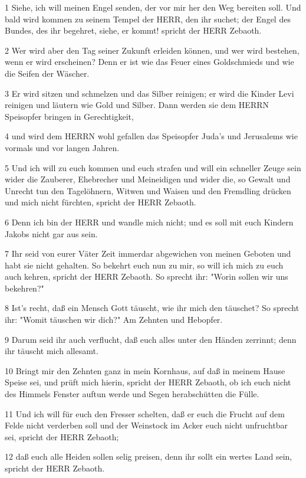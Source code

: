 \par 1 Siehe, ich will meinen Engel senden, der vor mir her den Weg bereiten soll. Und bald wird kommen zu seinem Tempel der HERR, den ihr suchet; der Engel des Bundes, des ihr begehret, siehe, er kommt! spricht der HERR Zebaoth.
\par 2 Wer wird aber den Tag seiner Zukunft erleiden können, und wer wird bestehen, wenn er wird erscheinen? Denn er ist wie das Feuer eines Goldschmieds und wie die Seifen der Wäscher.
\par 3 Er wird sitzen und schmelzen und das Silber reinigen; er wird die Kinder Levi reinigen und läutern wie Gold und Silber. Dann werden sie dem HERRN Speisopfer bringen in Gerechtigkeit,
\par 4 und wird dem HERRN wohl gefallen das Speisopfer Juda's und Jerusalems wie vormals und vor langen Jahren.
\par 5 Und ich will zu euch kommen und euch strafen und will ein schneller Zeuge sein wider die Zauberer, Ehebrecher und Meineidigen und wider die, so Gewalt und Unrecht tun den Tagelöhnern, Witwen und Waisen und den Fremdling drücken und mich nicht fürchten, spricht der HERR Zebaoth.
\par 6 Denn ich bin der HERR und wandle mich nicht; und es soll mit euch Kindern Jakobs nicht gar aus sein.
\par 7 Ihr seid von eurer Väter Zeit immerdar abgewichen von meinen Geboten und habt sie nicht gehalten. So bekehrt euch nun zu mir, so will ich mich zu euch auch kehren, spricht der HERR Zebaoth. So sprecht ihr: "Worin sollen wir uns bekehren?"
\par 8 Ist's recht, daß ein Mensch Gott täuscht, wie ihr mich den täuschet? So sprecht ihr: "Womit täuschen wir dich?" Am Zehnten und Hebopfer.
\par 9 Darum seid ihr auch verflucht, daß euch alles unter den Händen zerrinnt; denn ihr täuscht mich allesamt.
\par 10 Bringt mir den Zehnten ganz in mein Kornhaus, auf daß in meinem Hause Speise sei, und prüft mich hierin, spricht der HERR Zebaoth, ob ich euch nicht des Himmels Fenster auftun werde und Segen herabschütten die Fülle.
\par 11 Und ich will für euch den Fresser schelten, daß er euch die Frucht auf dem Felde nicht verderben soll und der Weinstock im Acker euch nicht unfruchtbar sei, spricht der HERR Zebaoth;
\par 12 daß euch alle Heiden sollen selig preisen, denn ihr sollt ein wertes Land sein, spricht der HERR Zebaoth.
